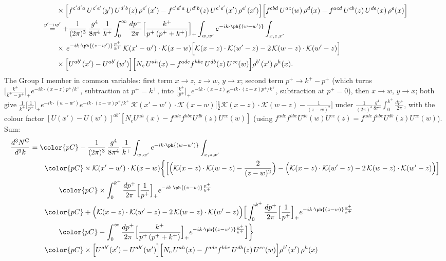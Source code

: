 \begin{align}
&\qquad\times\Big[f^{c'd'a}\,U^{c'e'}(y')\,U^{d'b}(z)\,\rho^{e'}(x')-f^{c'd'a}\,U^{d'b}(z)\,U^{c'e'}(x')\,\rho^{e'}(x')\Big]\Big[f^{cbd}\,U^{ac}(w)\,\rho^{d}(x)-f^{acd}\,U^{cb}(z)\,U^{de}(x)\,\rho^{e}(x)\Big]\notag\\
&\overset{y'\to w'}{=}+\frac{1}{(2\pi)^{3}}\,\frac{g^{4}}{8\pi^{4}}\,\frac{1}{k^{+}}\int_{0}^{\infty}\frac{dp^{+}}{2\pi}\Big[\frac{k^{+}}{p^{+}\,(p^{+}+k^{+})}\Big]_{+}\int_{w,w'}e^{-ik\cdot\ph{(w-w')}}\int_{x,z,x'}\notag\\
&\qquad\times\,e^{-ik\cdot\ph{(z-w')}\frac{p^{+}}{k^{+}}}\,\mathcal{K}(x'-w')\cdot\mathcal{K}(x-w)\Big[\mathcal{K}(x-z)\cdot\mathcal{K}(w'-z)-2\,\mathcal{K}(w-z)\cdot\mathcal{K}(w'-z)\Big]\notag\\
&\qquad\times\Big[U^{ab'}(x')-U^{ab'}(w')\Big]\Big[N_{c}\,U^{ah}(x)-f^{adc}f^{hbe}\,U^{db}(z)\,U^{ce}(w)\Big]\rho^{b'}(x')\,\rho^{h}(x).\notag
\end{align}
\endgroup
The Group I member in common variables: first term $x\to z$, $z\to w$, $y\to x$; second term $p^{+}\to k^{+}-p^{+}$ (which turns $\big[\frac{k^{+}}{k^{+}-p^{+}}\big]_{+}e^{-ik\cdot(x-z)p^{+}/k^{+}}$, subtraction at $p^{+}=k^{+}$, into $\big[\frac{k^{+}}{p^{+}}\big]_{+}e^{-ik\cdot(x-z)}e^{-ik\cdot(z-x)p^{+}/k^{+}}$, subtraction at $p^{+}=0$), then $x\to w$, $y\to x$; both give $\frac{1}{k^{+}}\big[\frac{1}{p^{+}}\big]_{+}e^{-ik\cdot(w-w')}e^{-ik\cdot(z-w)p^{+}/k^{+}}\,\mathcal{K}(x'-w')\cdot\mathcal{K}(x-w)\big[\frac12\mathcal{K}(x-z)\cdot\mathcal{K}(w-z)-\frac{1}{(z-w)^{2}}\big]$ under $\frac{1}{(2\pi)^{3}}\frac{g^{4}}{8\pi^{4}}\int_{0}^{k^{+}}\frac{dp^{+}}{2\pi}$, with the colour factor $[U(x')-U(w')]^{ab'}[N_{c}U^{ah}(x)-f^{adc}f^{hbe}U^{db}(z)U^{ce}(w)]$ (using $f^{adc}f^{hbe}U^{db}(w)U^{ce}(z)=f^{adc}f^{hbe}U^{db}(z)U^{ce}(w)$). Sum:
\begin{align}
\frac{d^{3}N^{\rm C}}{d^{3}k}&={\color{pC}-\frac{1}{(2\pi)^{3}}\,\frac{g^{4}}{8\pi^{4}}\,\frac{1}{k^{+}}\int_{w,w'}e^{-ik\cdot\ph{(w-w')}}\int_{x,z,x'}}\notag\\
&\qquad{\color{pC}\times\mathcal{K}(x'-w')\cdot\mathcal{K}(x-w)\bigg\{\Big[\Big(\mathcal{K}(x-z)\cdot\mathcal{K}(w-z)-\frac{2}{(z-w)^{2}}\Big)-\Big(\mathcal{K}(x-z)\cdot\mathcal{K}(w'-z)-2\,\mathcal{K}(w-z)\cdot\mathcal{K}(w'-z)\Big)\Big]}\notag\\
&\qquad\qquad{\color{pC}\times\int_{0}^{k^{+}}\frac{dp^{+}}{2\pi}\Big[\frac{1}{p^{+}}\Big]_{+}e^{-ik\cdot\ph{(z-w)}\frac{p^{+}}{k^{+}}}}\notag\\
&\qquad{\color{pC}+\Big(\mathcal{K}(x-z)\cdot\mathcal{K}(w'-z)-2\,\mathcal{K}(w-z)\cdot\mathcal{K}(w'-z)\Big)\Big[\int_{0}^{k^{+}}\frac{dp^{+}}{2\pi}\Big[\frac{1}{p^{+}}\Big]_{+}e^{-ik\cdot\ph{(z-w)}\frac{p^{+}}{k^{+}}}}\notag\\
&\qquad\qquad{\color{pC}-\int_{0}^{\infty}\frac{dp^{+}}{2\pi}\Big[\frac{k^{+}}{p^{+}\,(p^{+}+k^{+})}\Big]_{+}e^{-ik\cdot\ph{(z-w')}\frac{p^{+}}{k^{+}}}\Big]\bigg\}}\notag\\
&\qquad{\color{pC}\times\Big[U^{ab'}(x')-U^{ab'}(w')\Big]\Big[N_{c}\,U^{ah}(x)-f^{adc}f^{hbe}\,U^{db}(z)\,U^{ce}(w)\Big]\rho^{b'}(x')\,\rho^{h}(x)}\label{eq:C-C}
\end{align}
